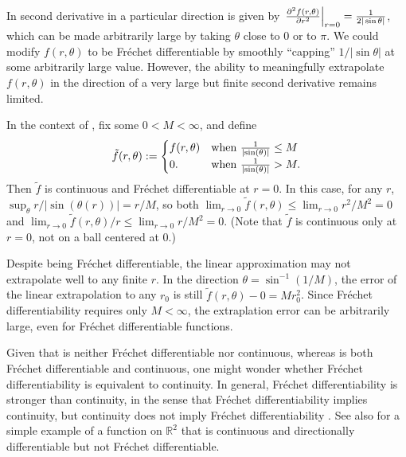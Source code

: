 \begin{ex}
%
In  second derivative in a particular direction is given
by $\left.\frac{\partial^2 f(r, \theta)}{\partial r^2}\right\vert_{r=0} = \frac{1}{2 |\sin
\theta|}$, which can be made arbitrarily large by taking $\theta$ close to $0$
or to $\pi$.  We could modify $f(r, \theta)$ to be Fr{\'e}chet differentiable by
smoothly ``capping'' $1 / |\sin \theta|$ at some arbitrarily large value.
However, the ability to meaningfully extrapolate $f(r, \theta)$ in the direction
of a very large but finite second derivative remains limited.

In the context of , fix some $0 < M < \infty$,
and define
%
\begin{align*}
%
\tilde{f}(r, \theta) := \begin{cases}
    f(r, \theta) & \textrm{when }\frac{1}{\abs{\sin(\theta)}} \le M \\
    0. & \textrm{when }\frac{1}{\abs{\sin(\theta)}} > M.
%
\end{cases}
%
\end{align*}
%
Then $\tilde{f}$ is continuous and Fr{\'e}chet differentiable at $r=0$. In this
case, for any $r$, $\sup_{\theta} r / |\sin(\theta(r))| = r / M$, so  both
$\lim_{r \rightarrow 0} \tilde{f}(r, \theta) \le \lim_{r \rightarrow 0} r^2 /
M^2 = 0$ and $\lim_{r \rightarrow 0} \tilde{f}(r, \theta) / r \le \lim_{r
\rightarrow 0}  r / M^2 = 0$.  (Note that $\tilde{f}$ is continuous only
at $r=0$, not on a ball centered at $0$.)

Despite being Fr{\'e}chet differentiable, the linear approximation may not
extrapolate well to any finite $r$.  In the direction $\theta = \sin^{-1}(1 /
M)$, the error of the linear extrapolation to any $r_0$ is still $\tilde{f}(r,
\theta) - 0 = M r_0^2$. Since Fr{\'e}chet differentiability requires only $M <
\infty$, the extraplation error can be arbitrarily large, even for Fr{\'e}chet
differentiable functions.

\end{ex}

Given that  is neither Fr{\'e}chet differentiable nor
continuous, whereas  is both Fr{\'e}chet differentiable
and continuous, one might wonder whether Fr{\'e}chet differentiability is
equivalent to continuity.  In general, Fr{\'e}chet differentiability is stronger
than continuity, in the sense that Fr{\'e}chet differentiability implies
continuity, but continuity does not imply Fr{\'e}chet differentiability
\citep[Proposition 4.8 (d)]{zeidler:2013:functional}.  See also \citet[Example
1.9]{averbukh:1967:theory} for a simple example of a function on $\mathbb{R}^2$
that is continuous and directionally differentiable but not Fr{\'e}chet
differentiable.

